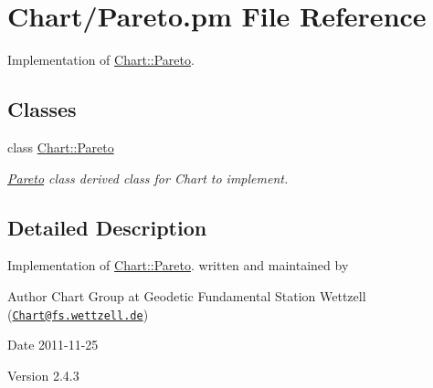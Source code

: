 \hypertarget{Pareto_8pm}{
\section{Chart/Pareto.pm File Reference}
\label{Pareto_8pm}
}


Implementation of \hyperlink{classChart_1_1Pareto}{Chart::Pareto}.  


\subsection*{Classes}
\begin{DoxyCompactItemize}
\item 
class \hyperlink{classChart_1_1Pareto}{Chart::Pareto}
\begin{DoxyCompactList}\small\item\em \hyperlink{classChart_1_1Pareto}{Pareto} class derived class for Chart to implement. \item\end{DoxyCompactList}\end{DoxyCompactItemize}


\subsection{Detailed Description}
Implementation of \hyperlink{classChart_1_1Pareto}{Chart::Pareto}. written and maintained by \begin{DoxyAuthor}{Author}
Chart Group at Geodetic Fundamental Station Wettzell (\href{mailto:Chart@fs.wettzell.de}{\tt Chart@fs.wettzell.de}) 
\end{DoxyAuthor}
\begin{DoxyDate}{Date}
2011-\/11-\/25 
\end{DoxyDate}
\begin{DoxyVersion}{Version}
2.4.3 
\end{DoxyVersion}
